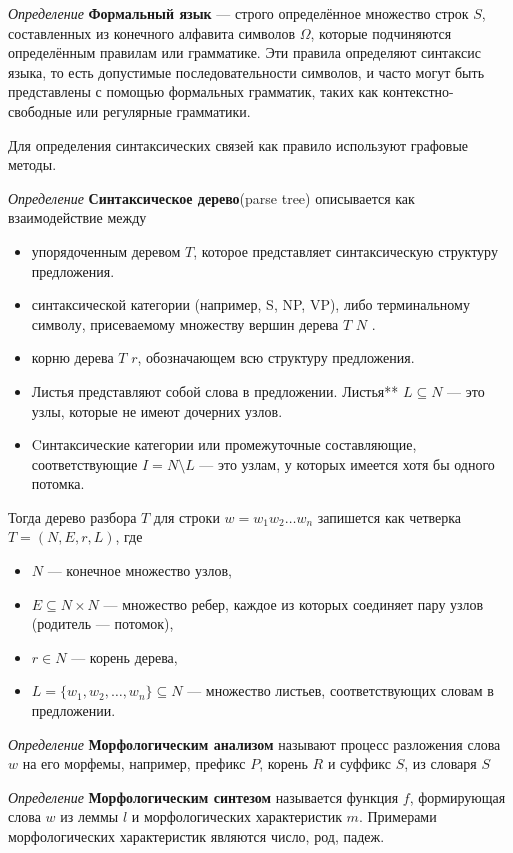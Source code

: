 \textit{Определение} \textbf{Формальный язык} — строго определённое множество строк $S$, составленных из конечного алфавита символов $\Omega$,
 которые подчиняются определённым правилам или грамматике.
Эти правила определяют синтаксис языка, то есть допустимые последовательности символов,
 и часто могут быть представлены с помощью формальных грамматик, таких как контекстно-свободные или регулярные грамматики.

Для определения синтаксических связей как правило используют графовые методы.

\textit{Определение} \textbf{Синтаксическое дерево}(parse tree) описывается как взаимодействие между \begin{itemize}
    \item упорядоченным деревом $T$, которое представляет синтаксическую структуру предложения.
    \item синтаксической категории (например, S, NP, VP), либо терминальному символу, присеваемому множеству вершин дерева $T$ $N$ . 
    \item корню дерева $T$  $r$, обозначающем всю структуру предложения. 
    \item Листья представляют собой слова в предложении. Листья** $L \subseteq N$ — это узлы, которые не имеют дочерних узлов. 
    \item Cинтаксические категории или промежуточные составляющие, соответствующие $I = N \setminus L$ — это узлам, у которых имеется хотя бы одного потомка. 
\end{itemize}

Тогда дерево разбора $T$ для строки $w = w_1 w_2 \ldots w_n$ запишется как четверка $T = (N, E, r, L)$, где \begin{itemize}
    \item $N$ — конечное множество узлов,
    \item $E \subseteq N \times N$ — множество ребер, каждое из которых соединяет пару узлов (родитель — потомок),
    \item  $r \in N$ — корень дерева,
    \item $L = \{ w_1, w_2, \ldots, w_n \} \subseteq N$ — множество листьев, соответствующих словам в предложении.
\end{itemize}


\textit{Определение} \textbf{Морфологическим анализом} называют процесс разложения 
слова $w$ на его морфемы, например, префикс $P$, корень $R$ и суффикс $S$, из словаря $S$

\textit{Определение} \textbf{Морфологическим синтезом} называется функция $f$,
формирующая слова $w$ из леммы $l$ и морфологических характеристик $m$. 
Примерами морфологических характеристик являются число, род, падеж.
 
